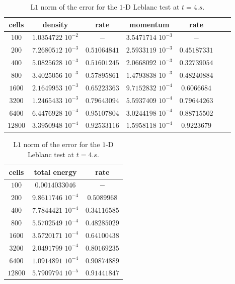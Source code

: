 \begin{table}[H]
\begin{center}
 \caption{\label{tbl:l1_norm_leblanc} L$1$ norm of the error for the $1$-D Leblanc test at $t=4.s$.}
 \begin{tabular}{|c|c|c|c|c|c|c|}
 \hline
   cells & density & rate & momentum & rate \\
 \hline
$100$ &   $1.0354722$ $10^{-2}$ & $-$ & $3.5471714$ $10^{-3}$ & $-$ \\
  \hline
$200$  &  $7.2680512$ $10^{-3}$ & $0.51064841$ & $2.5933119$ $10^{-3}$ & $0.45187331$ \\
   \hline
$400$ & $5.0825628$ $10^{-3}$   & $0.51601245$ & $2.0668092$ $10^{-3}$ & $0.32739054$ \\
 \hline
$800$ & $3.4025056$ $10^{-3}$   & $0.57895861$ & $1.4793838$ $10^{-3}$ & $0.48240884$ \\
 \hline
$1600$ & $2.1649953$ $10^{-3}$  & $0.65223363$ & $9.7152832$ $10^{-4}$ & $0.6066684$ \\
 \hline
$3200$&$1.2465433$ $10^{-3}$    & $0.79643094$ & $5.5937409$ $10^{-4}$ & $0.79644263$ \\
 \hline
$6400$& $6.4476928$ $10^{-4}$    & $0.95107804$ & $3.0244198$ $10^{-4}$ & $0.88715502$ \\
 \hline
 $12800$&$3.3950948$ $10^{-4}$  & $0.92533116$ & $1.5958118$ $10^{-4}$ & $0.9223679$ \\
 \hline
 \end{tabular}
 \begin{tabular}{|c|c|c|}
\hline
cells & total energy & rate \\ \hline
 $100$ & $0.0014033046$                   & $-$\\ \hline
  $200$  & $9.8611746$ $10^{-4}$& $0.5089968$\\ \hline
  $400$ & $7.7844421$ $10^{-4}$ & $0.34116585$\\ \hline
  $800$ & $5.5702549$ $10^{-4}$ & $0.48285029$\\ \hline
  $1600$ & $3.5720171$ $10^{-4}$ & $0.64100438$\\ \hline
  $3200$ & $2.0491799$ $10^{-4}$ & $0.80169235$\\ \hline
  $6400$ & $1.0914891$ $10^{-4}$ & $0.90874889$\\ \hline
   $12800$&$5.7909794$ $10^{-5}$ & $0.91441847$\\ \hline
\end{tabular}
\end{center}
\nonumber
\end{table}
